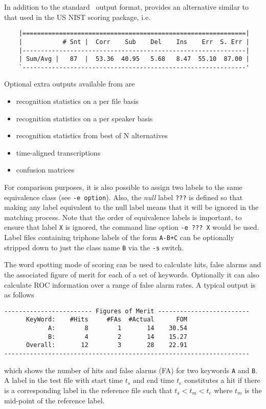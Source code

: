 In addition to the standard \HTK\ output format, 
 provides an alternative similar to that used
in the US NIST scoring package, i.e.\
\begin{verbatim}
    |=============================================================|
    |           # Snt |  Corr    Sub    Del    Ins    Err  S. Err |
    |-------------------------------------------------------------|
    | Sum/Avg |   87  |  53.36  40.95   5.68   8.47  55.10  87.00 |
    `-------------------------------------------------------------'

\end{verbatim}
\noindent
Optional extra outputs available from  are
\begin{itemize}
 \item   recognition statistics on a per file basis
 \item   recognition statistics on a per speaker basis
 \item   recognition statistics from best of N alternatives
 \item   time-aligned transcriptions
 \item   confusion matrices
\end{itemize}
For comparison purposes, it is also possible to assign two
labels to the same equivalence class (see {\tt -e option}).  
Also, the {\em null} label {\tt ???} is defined so that making any
label equivalent to the null label means that it will be
ignored in the matching process.  Note that the order of equivalence
labels is important, to ensure that label {\tt X} is ignored, the
command line option \verb+-e ??? X+ would be used.
Label files containing triphone labels of the form {\tt A-B+C} can be 
optionally stripped down to just the class name {\tt B} via the {\tt -s} 
switch.

The word spotting mode of scoring can be used to calculate hits,
false alarms and the associated figure of merit for each of a
set of keywords.
Optionally it can also calculate ROC information over a range of
false alarm rates.  A typical output is as follows
\begin{verbatim}
------------------------ Figures of Merit -------------------------
      KeyWord:    #Hits     #FAs  #Actual      FOM
            A:        8        1       14    30.54
            B:        4        2       14    15.27
      Overall:       12        3       28    22.91
-------------------------------------------------------------------
\end{verbatim}
which shows the number of hits and false alarms (FA) for two keywords
\texttt{A} and \texttt{B}.  A label in the test file with start time $t_s$
and end time $t_e$ constitutes a hit if there is a corresponding label
in the reference file such that $t_s < t_m < t_e$ where $t_m$ is the
mid-point of the reference label.

